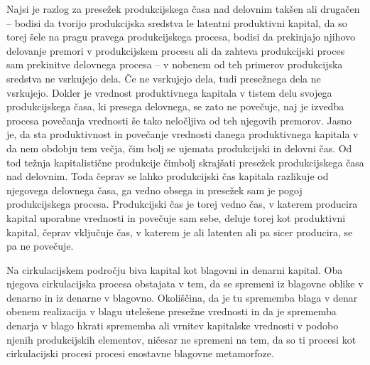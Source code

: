 \documentclass[kapital_02.tex]{subfiles}
\begin{document}
Najsi je razlog za presežek produkcijskega časa nad delovnim takšen ali drugačen -- bodisi da tvorijo produkcijska sredstva le latentni produktivni kapital, da so torej šele na pragu pravega produkcijskega procesa, bodisi da prekinjajo njihovo delovanje premori v produkcijskem procesu ali da zahteva produkcijski proces sam prekinitve delovnega procesa -- v nobenem od teh primerov produkcijska sredstva ne vsrkujejo dela. Če ne vsrkujejo dela, tudi presežnega dela ne vsrkujejo. Dokler je vrednost produktivnega kapitala v tistem delu svojega produkcijskega časa, ki presega delovnega, se zato ne povečuje, naj je izvedba procesa povečanja vrednosti še tako neločljiva od teh njegovih premorov. Jasno je, da sta produktivnost in povečanje vrednosti danega produktivnega kapitala v da nem obdobju tem večja, čim bolj se ujemata produkcijski in delovni čas. Od tod težnja kapitalistične produkcije čimbolj skrajšati presežek produkcijskega časa nad delovnim. Toda čeprav se lahko produkcijski čas kapitala razlikuje od njegovega delovnega časa, ga vedno obsega in presežek sam je pogoj produkcijskega procesa. Produkcijski čas je torej vedno čas, v katerem producira kapital uporabne vrednosti in povečuje sam sebe, deluje torej kot produktivni kapital, čeprav vključuje čas, v katerem je ali latenten ali pa sicer producira, se pa ne povečuje.

Na cirkulacijskem področju biva kapital kot blagovni in denarni kapital. Oba njegova cirkulacijska procesa obstajata v tem, da se spremeni iz blagovne oblike v denarno in iz denarne v blagovno. Okoliščina, da je tu sprememba blaga v denar obenem realizacija v blagu utelešene presežne vrednosti in da je sprememba denarja v blago hkrati sprememba ali vrnitev kapitalske vrednosti v podobo njenih produkcijskih elementov, ničesar ne spremeni na tem, da so ti procesi kot cirkulacijski procesi procesi enostavne blagovne metamorfoze.
\end{document}
